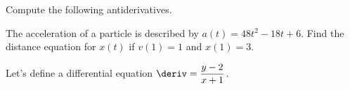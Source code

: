 \begin{questions}
    \question Compute the following antiderivatives. \\


    \horizontalline

    \question The acceleration of a particle is described by $a(t) = 48t^2 - 18t + 6$. Find the distance equation for $x(t)$ if $v(1) = 1$ and $x(1) = 3$.

    \vfill

    \horizontalline

    \newpage

    \question Let's define a differential equation $\deriv = \dfrac{y - 2}{x + 1}$. \\

    \begin{parts}

\end{parts}
\end{questions}
